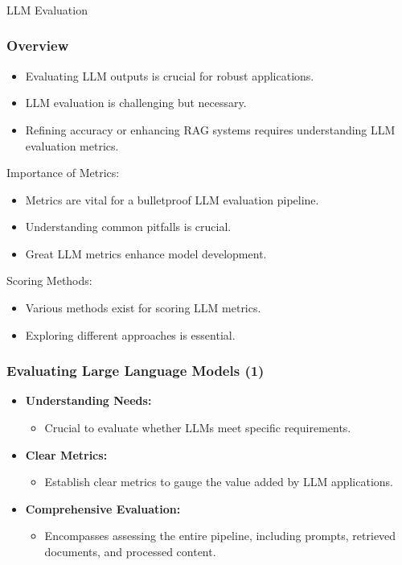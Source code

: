 \begin{frame}[fragile]\frametitle{}
\begin{center}
{\Large LLM Evaluation}
\end{center}
\end{frame}

\begin{frame}[fragile]\frametitle{Overview}
  \begin{itemize}
    \item Evaluating LLM outputs is crucial for robust applications.
    \item LLM evaluation is challenging but necessary.
    \item Refining accuracy or enhancing RAG systems requires understanding LLM evaluation metrics.
  \end{itemize}

Importance of Metrics:
  \begin{itemize}
    \item Metrics are vital for a bulletproof LLM evaluation pipeline.
    \item Understanding common pitfalls is crucial.
    \item Great LLM metrics enhance model development.
  \end{itemize}
  
Scoring Methods:
  \begin{itemize}
    \item Various methods exist for scoring LLM metrics.
    \item Exploring different approaches is essential.
  \end{itemize}
\end{frame}

\begin{frame}[fragile]\frametitle{Evaluating Large Language Models (1)}
  \begin{itemize}
    \item \textbf{Understanding Needs:}
      \begin{itemize}
        \item Crucial to evaluate whether LLMs meet specific requirements.
      \end{itemize}
    \item \textbf{Clear Metrics:}
      \begin{itemize}
        \item Establish clear metrics to gauge the value added by LLM applications.
      \end{itemize}
    \item \textbf{Comprehensive Evaluation:}
      \begin{itemize}
        \item Encompasses assessing the entire pipeline, including prompts, retrieved documents, and processed content.
      \end{itemize}
  \end{itemize}
\end{frame}

